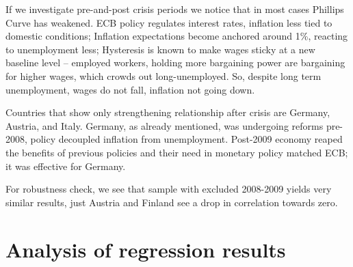 \documentclass[preprint,10pt,authoryear]{elsarticle}
\begin{document}
If we investigate pre-and-post crisis periods we notice that in most cases Phillips Curve has weakened. ECB policy regulates interest rates, inflation less tied to domestic conditions; Inflation expectations become anchored around 1\%, reacting to unemployment less; Hysteresis is known to make wages sticky at a new baseline level – employed workers, holding more bargaining power are bargaining for higher wages, which crowds out long-unemployed. So, despite long term unemployment, wages do not fall, inflation not going down.  

Countries that show only strengthening relationship after crisis are Germany, Austria, and Italy. Germany, as already mentioned, was undergoing reforms pre-2008, policy decoupled inflation from unemployment. Post-2009 economy reaped the benefits of previous policies and their need in monetary policy matched ECB; it was effective for Germany. 

For robustness check, we see that sample with excluded 2008-2009 yields very similar results, just Austria and Finland see a drop in correlation towards zero.


\section{Analysis of regression results}
\end{document}
